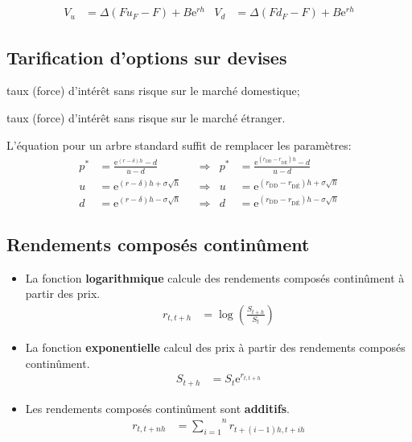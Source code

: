 \documentclass[10pt, french]{article}
\begin{document}
\begin{multicols*}{2}
\begin{align*}
	V_{u}
		&=	\Delta	(F u_{F} - F) + B \textrm{e}^{rh}	&
	V_{d}
		&=	\Delta	(F d_{F} - F) + B \textrm{e}^{rh}
\end{align*}

\subsection{Tarification d'options sur devises}
\begin{distributions}[Notation]
\begin{description}[leftmargin = *]
	\item[$r_{\text{DD}}$]	taux (force) d'intérêt sans risque sur le marché domestique;
	\item[$r_{\text{DÉ}}$]	taux (force) d'intérêt sans risque sur le marché étranger.
\end{description}
\end{distributions}

L'équation pour un arbre standard suffit de remplacer les paramètres:
\begin{align*}
	p^{*}	&=	\frac{\textrm{e}^{(r - \delta)h} - d}{u - d}	&
	&\Rightarrow	&
	p^{*}	&=	\frac{\textrm{e}^{(r_{\text{DD}} - r_{\text{DÉ}})h} - d}{u - d}	\\
	u	&=	\textrm{e}^{(r - \delta)h + \sigma \sqrt{h}}	&
	&\Rightarrow	&
	u	&=	\textrm{e}^{(r_{\text{DD}} - r_{\text{DÉ}})h + \sigma \sqrt{h}}	\\
	d	&=	\textrm{e}^{(r - \delta)h - \sigma \sqrt{h}}	&
	&\Rightarrow	&
	d	&=	\textrm{e}^{(r_{\text{DD}} - r_{\text{DÉ}})h - \sigma \sqrt{h}}	
\end{align*}
	
\subsection{Rendements composés continûment}
\begin{itemize}
	\item	La fonction \textbf{logarithmique} calcule des rendements composés continûment à partir des prix.
		\begin{align*}
		r_{t, t + h} &= \log\left(\frac{S_{t + h}}{S_{t}}\right)
		\end{align*}
	\item	La fonction \textbf{exponentielle} calcul des prix à partir des rendements composés continûment.
		\begin{align*}
		S_{t + h}	&=	S_{t}\textrm{e}^{r_{t, t + h}}
		\end{align*}
	\item	Les rendements composés continûment sont \textbf{additifs}.
		\begin{align*}
		r_{t, t + nh}	&=	\overset{n}{\underset{i = 1}{\sum}} r_{t + (i - 1)h, t + ih}
		\end{align*}
\end{itemize}	


\end{multicols*}
\end{document}
